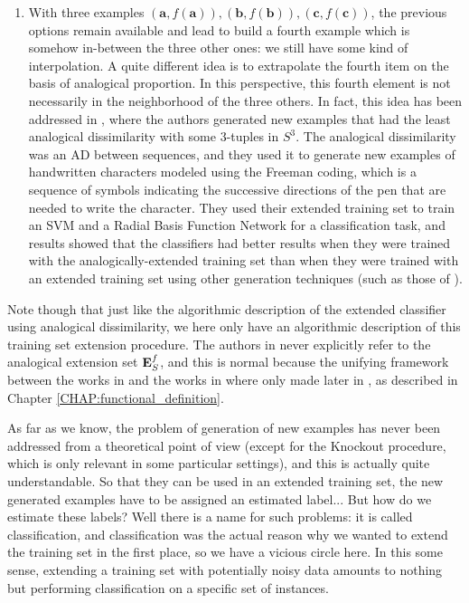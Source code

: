 \begin{enumerate}
\item With three examples $(\mathbf{a},f(\mathbf{a})),
  (\mathbf{b},f(\mathbf{b})), (\mathbf{c},f(\mathbf{c}))$, the previous options
    remain available and lead to build a fourth example which is somehow
    in-between the three other ones: we still have some kind of interpolation.
    A quite different idea is to extrapolate the fourth item on the basis of
    analogical proportion.  In this perspective, this fourth element is not
    necessarily in the neighborhood of the three others. In fact, this idea has
    been addressed in \cite{BayMouMicAnqECML07}, where the authors generated
    new examples that had the least analogical dissimilarity with some
    $3$-tuples in $S^3$. The analogical dissimilarity was an AD between
    sequences, and they used it to generate new examples of handwritten
    characters modeled using the Freeman coding, which is a sequence of symbols
    indicating the successive directions of the pen that are needed to write
    the character. They used their extended training set to train an SVM and a
    Radial Basis Function Network for a classification task, and results showed
    that the classifiers had better results when they were trained with the
    analogically-extended training set than when they were trained with an
    extended training set using other generation techniques (such as those of
    \cite{CanPerArlLlo06}).
\end{enumerate}

Note though that just like the algorithmic description of the extended
classifier using analogical dissimilarity, we here only have an algorithmic
description of this training set extension procedure. The authors in
\cite{BayMouMicAnqECML07} never explicitly refer to the analogical extension
set $\mathbf{E}_{S}^{f}$, and this is normal because the unifying framework between the works
in \cite{BayMicDelIJCAI07} and the works in \cite{StrYvoCNLL05} where only made
later in \cite{HugPraRicSerECAI16}, as described in Chapter
\ref{CHAP:functional_definition}.

As far as we know, the problem of generation of new examples has never been
addressed from a theoretical point of view (except for the Knockout procedure,
which is only relevant in some particular settings), and this is actually quite
understandable. So that they can be used in an extended training set, the new
generated examples have to be assigned an estimated label... But how do we
estimate these labels? Well there is a name for such problems: it is called
classification, and classification was the actual reason why we wanted to
extend the training set in the first place, so we have a vicious circle here.
In this some sense, extending a training set with potentially noisy data
amounts to nothing but performing classification on a specific set of
instances.


